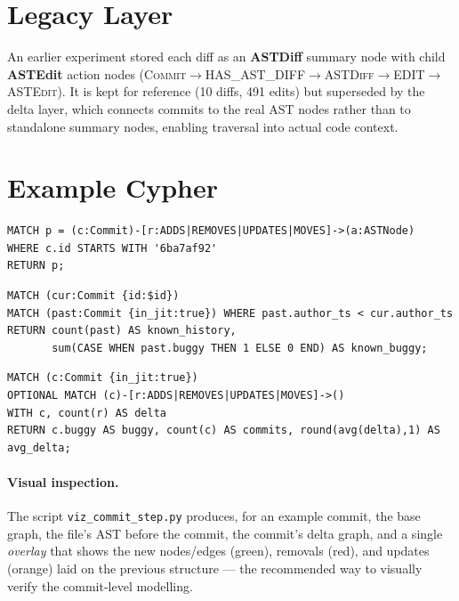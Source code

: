 \documentclass[11pt,a4paper]{article}
\newcommand{\node}[1]{\textcolor{kgblue}{\textbf{#1}}}
\newcommand{\edge}[1]{\textsc{#1}}
\begin{document}
\section{Legacy Layer}\label{sec:legacy}
An earlier experiment stored each diff as an \node{ASTDiff} summary node with
child \node{ASTEdit} action nodes
(\edge{Commit}$\rightarrow$\edge{HAS\_AST\_DIFF}$\rightarrow$\edge{ASTDiff}$\rightarrow$\edge{EDIT}$\rightarrow$\edge{ASTEdit}).
It is kept for reference (10 diffs, 491 edits) but superseded by the delta layer,
which connects commits to the real AST nodes rather than to standalone summary
nodes, enabling traversal into actual code context.

\appendix
\section{Example Cypher}
\begin{lstlisting}[style=cypher,caption={A commit's delta graph (Graph view).}]
MATCH p = (c:Commit)-[r:ADDS|REMOVES|UPDATES|MOVES]->(a:ASTNode)
WHERE c.id STARTS WITH '6ba7af92'
RETURN p;
\end{lstlisting}

\begin{lstlisting}[style=cypher,caption={Online evaluation window: history known when a commit arrives.}]
MATCH (cur:Commit {id:$id})
MATCH (past:Commit {in_jit:true}) WHERE past.author_ts < cur.author_ts
RETURN count(past) AS known_history,
       sum(CASE WHEN past.buggy THEN 1 ELSE 0 END) AS known_buggy;
\end{lstlisting}

\begin{lstlisting}[style=cypher,caption={Average AST-delta size: buggy vs.\ benign.}]
MATCH (c:Commit {in_jit:true})
OPTIONAL MATCH (c)-[r:ADDS|REMOVES|UPDATES|MOVES]->()
WITH c, count(r) AS delta
RETURN c.buggy AS buggy, count(c) AS commits, round(avg(delta),1) AS avg_delta;
\end{lstlisting}

\paragraph{Visual inspection.} The script
\texttt{viz\_commit\_step.py} produces, for an example commit, the base graph,
the file's AST before the commit, the commit's delta graph, and a single
\emph{overlay} that shows the new nodes/edges (green), removals (red), and
updates (orange) laid on the previous structure --- the recommended way to
visually verify the commit-level modelling.
\end{document}
